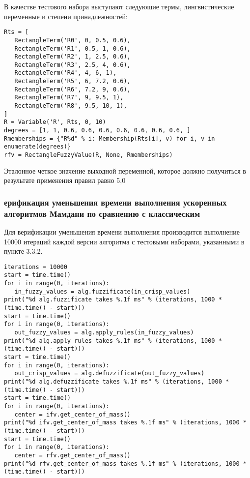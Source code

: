 В качестве тестового набора выступают следующие термы, лингвистические переменные и степени принадлежностей:

\begin{lstlisting}[style=pythonstyle,caption={  }, label=lst:func:1]
Rts = [
   RectangleTerm('R0', 0, 0.5, 0.6),
   RectangleTerm('R1', 0.5, 1, 0.6),
   RectangleTerm('R2', 1, 2.5, 0.6),
   RectangleTerm('R3', 2.5, 4, 0.6),
   RectangleTerm('R4', 4, 6, 1),
   RectangleTerm('R5', 6, 7.2, 0.6),
   RectangleTerm('R6', 7.2, 9, 0.6),
   RectangleTerm('R7', 9, 9.5, 1),
   RectangleTerm('R8', 9.5, 10, 1),
]
R = Variable('R', Rts, 0, 10)
degrees = [1, 1, 0.6, 0.6, 0.6, 0.6, 0.6, 0.6, 0.6, ]
Rmemberships = {"R%d" % i: Membership(Rts[i], v) for i, v in enumerate(degrees)}
rfv = RectangleFuzzyValue(R, None, Rmemberships)
\end{lstlisting}

Эталонное четкое значение выходной переменной, которое должно получиться в результате применения правил равно 5,0


\subsubsection{ерификация уменьшения времени выполнения ускоренных алгоритмов Мамдани по сравнению с классическим }

Для верификации уменьшения времени выполнения производится выполнение 10000 итераций каждой версии алгоритма с тестовыми наборами, указанными в пункте 3.3.2.

\begin{lstlisting}[style=pythonstyle,caption={  }, label=lst:func:1]
iterations = 10000
start = time.time()
for i in range(0, iterations):
   in_fuzzy_values = alg.fuzzificate(in_crisp_values)
print("%d alg.fuzzificate takes %.1f ms" % (iterations, 1000 * (time.time() - start)))
start = time.time()
for i in range(0, iterations):
   out_fuzzy_values = alg.apply_rules(in_fuzzy_values)
print("%d alg.apply_rules takes %.1f ms" % (iterations, 1000 * (time.time() - start)))
start = time.time()
for i in range(0, iterations):
   out_crisp_values = alg.defuzzificate(out_fuzzy_values)
print("%d alg.defuzzificate takes %.1f ms" % (iterations, 1000 * (time.time() - start)))
start = time.time()
for i in range(0, iterations):
   center = ifv.get_center_of_mass()
print("%d ifv.get_center_of_mass takes %.1f ms" % (iterations, 1000 * (time.time() - start)))
start = time.time()
for i in range(0, iterations):
   center = rfv.get_center_of_mass()
print("%d rfv.get_center_of_mass takes %.1f ms" % (iterations, 1000 * (time.time() - start)))
\end{lstlisting}